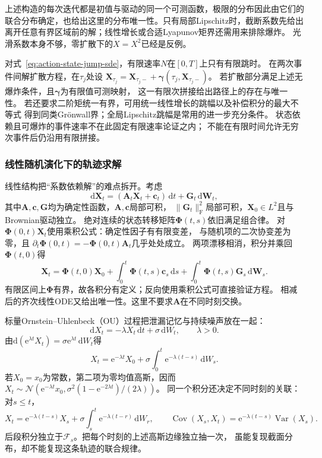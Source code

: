 上述构造的每次迭代都是初值与驱动的同一个可测函数，极限的分布因此由它们的
联合分布确定，也给出这里的分布唯一性。只有局部Lipschitz时，截断系数先给出
离开任意有界区域前的解；线性增长或合适Lyapunov矩界还需用来排除爆炸。
光滑系数本身不够，零扩散下的$\dot X=X^2$已经是反例。

对式~\eqref{eq:action-state-jump-sde}，有限速率$N$在$[0,T]$上只有有限跳时。
在两次事件间解扩散方程，在$\tau_j$处设
$\bm X_{\tau_j}=\bm X_{\tau_j-}
                    +\bm\gamma(\tau_j,\bm X_{\tau_j-})$。
若扩散部分满足上述无爆炸条件，且$\bm\gamma$为有限值可测映射，
这一有限次拼接给出路径上的存在与唯一性。
若还要求二阶矩统一有界，可用统一线性增长的跳幅以及补偿积分的最大不等式
得到同类Grönwall界；全局Lipschitz跳幅是常用的进一步充分条件。
状态依赖且可爆炸的事件速率不在此固定有限速率论证之内；
不能在有限时间允许无穷次事件后仍沿用有限拼接。

\subsubsection{线性随机演化下的轨迹求解}
\label{sec:action-state-linear-sde-solution}

线性结构把“系数依赖解”的难点拆开。考虑
\[
 \mathrm d\bm X_t=(\bm A_t\bm X_t+\bm c_t)\,\mathrm dt
                       +\bm G_t\,\mathrm d\bm W_t,
\]
其中$\bm A,\bm c,\bm G$均为确定性函数，$\bm A,\bm c$局部可积，
$\|\bm G_t\|_{\mathrm F}^2$局部可积，$\bm X_0\in L^2$且与Brownian驱动独立。
绝对连续的状态转移矩阵$\bm\Phi(t,s)$依旧满足组合律。
对$\bm\Phi(0,t)\bm X_t$使用乘积公式：确定性因子有有限变差，
与随机项的二次协变差为零，且
$\partial_t\bm\Phi(0,t)=-\bm\Phi(0,t)\bm A_t$几乎处处成立。
两项漂移相消，积分并乘回$\bm\Phi(t,0)$得
\begin{equation}
 \bm X_t=\bm\Phi(t,0)\bm X_0+
       \int_0^t\bm\Phi(t,s)\bm c_s\,\mathrm ds+
       \int_0^t\bm\Phi(t,s)\bm G_s\,\mathrm d\bm W_s.
 \label{eq:action-state-linear-sde-solution}
\end{equation}
有限区间上$\bm\Phi$有界，故各积分有定义；反向使用乘积公式可直接验证方程。
相减后的齐次线性ODE又给出唯一性。这里不要求$\bm A$在不同时刻交换。

标量Ornstein--Uhlenbeck（OU）过程把泄漏记忆与持续噪声放在一起：
\begin{equation}
 \mathrm dX_t=-\lambda X_t\,\mathrm dt+\sigma\,\mathrm dW_t,\qquad\lambda>0.
 \label{eq:dynamical-ou-sde}
\end{equation}
由$\mathrm d(\mathrm e^{\lambda t}X_t)=
\sigma\mathrm e^{\lambda t}\,\mathrm dW_t$得
\[
 X_t=\mathrm e^{-\lambda t}X_0+
                  \sigma\int_0^t\mathrm e^{-\lambda(t-s)}\,\mathrm dW_s.
\]
若$X_0=x_0$为常数，第二项为零均值高斯，因而
$X_t\sim\mathcal N(\mathrm e^{-\lambda t}x_0,
\sigma^2(1-\mathrm e^{-2\lambda t})/(2\lambda))$。
同一个积分还决定不同时刻的关联：对$s\leq t$，
\[
 X_t=\mathrm e^{-\lambda(t-s)}X_s+
          \sigma\int_s^t\mathrm e^{-\lambda(t-r)}\,\mathrm dW_r,
 \qquad
 \operatorname{Cov}(X_s,X_t)=
          \mathrm e^{-\lambda(t-s)}\operatorname{Var}(X_s).
\]
后段积分独立于$\mathcal F_s$。把每个时刻的上述高斯边缘独立抽一次，
虽能复现截面分布，却不能复现这条轨迹的联合规律。

